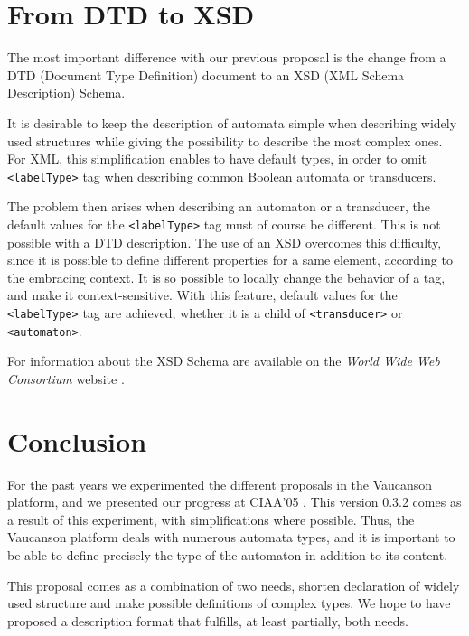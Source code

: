 \documentclass[a4paper]{article}
\newcommand{\Vauc}{{\sc Vaucanson}\xspace}
\newcommand{\xtag}[1]{\texttt{<#1>}}
\def\typetag{\xtag{labelType}}
\def\automatontag{\xtag{automaton}}
\def\transducertag{\xtag{transducer}}
\begin{document}
\section{From DTD to XSD}
The most important difference with our previous proposal
\cite{vaucanson.04.techrep} is the change from a DTD (Document Type Definition)
document to an XSD (XML Schema Description) Schema.

It is desirable to keep the description of automata simple when
describing widely used structures while giving the possibility to
describe the most complex ones. For XML, this simplification enables
to have default types, in order to omit \typetag{} tag when describing
common Boolean automata or transducers.

The problem then arises when describing an automaton or a transducer,
the default values for the \typetag{} tag must of course be different.
This is not possible with a DTD description.  The use of an XSD
overcomes this difficulty, since it is possible to define different
properties for a same element, according to the embracing context. It
is so possible to locally change the behavior of a tag, and make it
context-sensitive. With this feature, default values for the
\typetag{} tag are achieved, whether it is a child of
\transducertag{} or \automatontag{}.

For information about the XSD Schema are available on the
\textit{World Wide Web Consortium} website \cite{w3c.www}.

\section{Conclusion}

For the past years we experimented the different proposals in the
\Vauc platform, and we presented our progress at CIAA'05
\cite{claveirole.05.ciaa}. This version 0.3.2 comes as a result of this
experiment, with simplifications where possible. Thus, the \Vauc platform deals
with numerous automata types, and it is important to be able to define
precisely the type of the automaton in addition to its content.

This proposal comes as a combination of two needs, shorten declaration
of widely used structure and make possible definitions of complex
types. We hope to have proposed a description format that fulfills, at
least partially, both needs.

\nocite{lombardy.04.tcs}
\nocite{claveirole.05.ciaa}
\nocite{vaucanson.04.techrep}
\nocite{vaucanson.www.xml}
\nocite{vaucanson.www.xsd}
\nocite{w3c.www}




\end{document}
